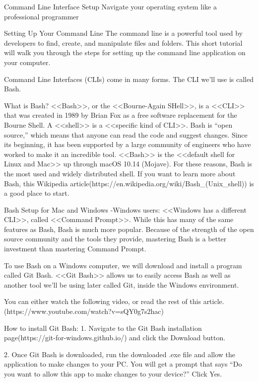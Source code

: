 Command Line Interface Setup
        Navigate your operating system like a professional programmer

Setting Up Your Command Line
        The command line is a powerful tool used by developers to find, create, and manipulate files and folders. This short tutorial will walk you through the steps for setting up the command line application on your computer.

        Command Line Interfaces (CLIs) come in many forms. The CLI we’ll use is called Bash.

    What is Bash?
        <<Bash>>, or the <<Bourne-Again SHell>>, is a <<CLI>> that was created in 1989 by Brian Fox as a free software replacement for the Bourne Shell. A <<shell>> is a <<specific kind of CLI>>. Bash is “open source,” which means that anyone can read the code and suggest changes. Since its beginning, it has been supported by a large community of engineers who have worked to make it an incredible tool. <<Bash>> is the <<default shell for Linux and Mac>> up through macOS 10.14 (Mojave). For these reasons, Bash is the most used and widely distributed shell. If you want to learn more about Bash, this Wikipedia article(https://en.wikipedia.org/wiki/Bash_(Unix_shell)) is a good place to start.

    Bash Setup for Mac and Windows
      -Windows users:
        <<Windows has a different CLI>>, called <<Command Prompt>>. While this has many of the same features as Bash, Bash is much more popular. Because of the strength of the open source community and the tools they provide, mastering Bash is a better investment than mastering Command Prompt.

        To use Bash on a Windows computer, we will download and install a program called Git Bash. <<Git Bash>> allows us to easily access Bash as well as another tool we’ll be using later called Git, inside the Windows environment.

        You can either watch the following video, or read the rest of this article.(https://www.youtube.com/watch?v=sQY0g7s2hac)

    How to install Git Bash:
        1. Navigate to the Git Bash installation page(https://git-for-windows.github.io/) and click the Download button.
        
        2. Once Git Bash is downloaded, run the downloaded .exe file and allow the application to make changes to your PC. You will get a prompt that says “Do you want to allow this app to make changes to your device?” Click Yes.

